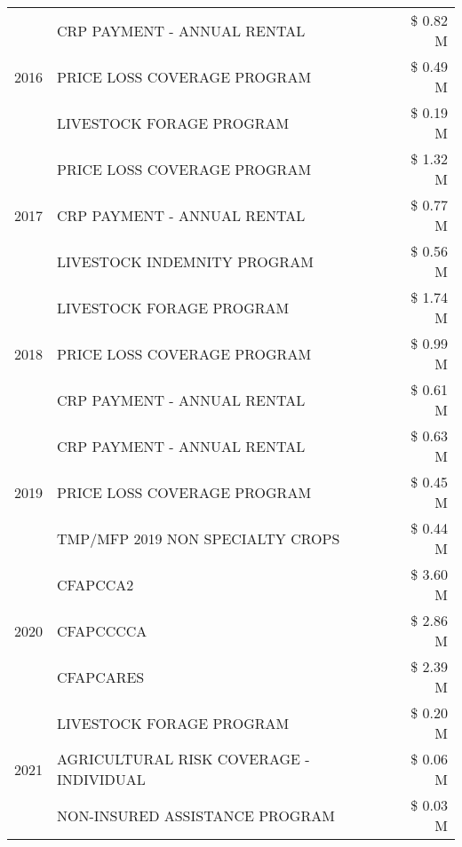 \begin{tabular}{llr}
\cline{1-3}
\multirow[t]{3}{*}{2016} & CRP PAYMENT - ANNUAL RENTAL & \$ 0.82 M \\
 & PRICE LOSS COVERAGE PROGRAM & \$ 0.49 M \\
 & LIVESTOCK FORAGE PROGRAM & \$ 0.19 M \\
\cline{1-3}
\multirow[t]{3}{*}{2017} & PRICE LOSS COVERAGE PROGRAM & \$ 1.32 M \\
 & CRP PAYMENT - ANNUAL RENTAL & \$ 0.77 M \\
 & LIVESTOCK INDEMNITY PROGRAM & \$ 0.56 M \\
\cline{1-3}
\multirow[t]{3}{*}{2018} & LIVESTOCK FORAGE PROGRAM & \$ 1.74 M \\
 & PRICE LOSS COVERAGE PROGRAM & \$ 0.99 M \\
 & CRP PAYMENT - ANNUAL RENTAL & \$ 0.61 M \\
\cline{1-3}
\multirow[t]{3}{*}{2019} & CRP PAYMENT - ANNUAL RENTAL & \$ 0.63 M \\
 & PRICE LOSS COVERAGE PROGRAM & \$ 0.45 M \\
 & TMP/MFP 2019 NON SPECIALTY CROPS & \$ 0.44 M \\
\cline{1-3}
\multirow[t]{3}{*}{2020} & CFAPCCA2 & \$ 3.60 M \\
 & CFAPCCCCA & \$ 2.86 M \\
 & CFAPCARES & \$ 2.39 M \\
\cline{1-3}
\multirow[t]{3}{*}{2021} & LIVESTOCK FORAGE PROGRAM & \$ 0.20 M \\
 & AGRICULTURAL RISK COVERAGE - INDIVIDUAL & \$ 0.06 M \\
 & NON-INSURED ASSISTANCE PROGRAM & \$ 0.03 M \\
\cline{1-3}
\bottomrule
\end{tabular}
